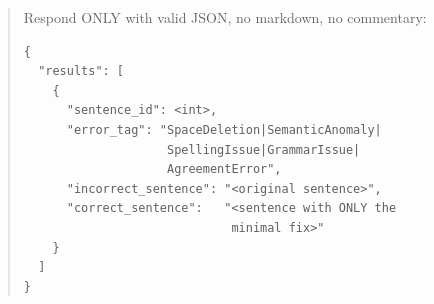 \documentclass[11pt]{article}
\begin{document}
\begin{quote}
Respond ONLY with valid JSON, no markdown, no
commentary:

\begin{verbatim}
{
  "results": [
    {
      "sentence_id": <int>,
      "error_tag": "SpaceDeletion|SemanticAnomaly|
                    SpellingIssue|GrammarIssue|
                    AgreementError",
      "incorrect_sentence": "<original sentence>",
      "correct_sentence":   "<sentence with ONLY the
                             minimal fix>"
    }
  ]
}
\end{verbatim}
\end{quote}
\end{document}
